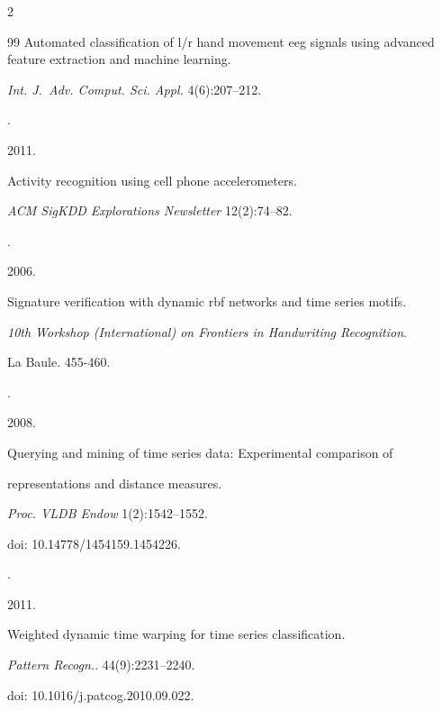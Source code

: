 \begin{multicols}{2}
{{\begin{thebibliography}{99}
Automated classification of l/r hand movement eeg signals using advanced feature extraction and machine learning.


\textit{Int. J.~Adv. Comput. Sci. Appl.} 4(6):207--212.







.


2011.


Activity recognition using cell phone accelerometers.


\textit{ACM SigKDD Explorations Newsletter} 12(2):74--82.







.


2006.


 Signature verification with dynamic rbf networks and time series motifs.


\textit{10th  Workshop (International) on Frontiers in Handwriting Recognition}.


 La Baule. 455-460.







.


2008.


 Querying and mining of time series data: Experimental comparison of 


 representations and distance measures.


\textit{Proc. VLDB Endow} 1(2):1542--1552.


 doi: 10.14778/1454159.1454226.







.


2011.


 Weighted dynamic time warping for time series classification.


\textit{Pattern Recogn.}. 44(9):2231--2240.


doi: 10.1016/j.patcog.2010.09.022.






\end{thebibliography}}}
\end{multicols}
